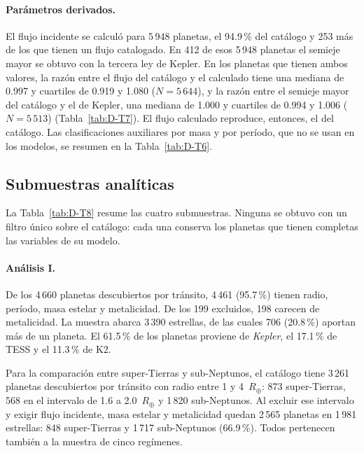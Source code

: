 \paragraph{Parámetros derivados.}
El flujo incidente se calculó para 5\,948 planetas, el 94.9\,\% del catálogo y 253 más
de los que tienen un flujo catalogado. En 412 de esos 5\,948 planetas el semieje mayor se
obtuvo con la tercera ley de Kepler. En los planetas que tienen ambos valores, la razón entre el flujo del
catálogo y el calculado tiene una mediana de 0.997 y cuartiles de 0.919 y 1.080
($N = 5\,644$), y la razón entre el semieje mayor del catálogo y el de Kepler, una mediana
de 1.000 y cuartiles de 0.994 y 1.006 ($N = 5\,513$) (Tabla~\ref{tab:D-T7}). El flujo
calculado reproduce, entonces, el del catálogo. Las clasificaciones auxiliares por masa y
por período, que no se usan en los modelos, se resumen en la Tabla~\ref{tab:D-T6}.

\subsection{Submuestras analíticas}
\label{sec:res-submuestras}

La Tabla~\ref{tab:D-T8} resume las cuatro submuestras. Ninguna se obtuvo con un filtro
único sobre el catálogo: cada una conserva los planetas que tienen completas las variables
de su modelo.



\paragraph{Análisis I.}
De los 4\,660 planetas descubiertos por tránsito, 4\,461 (95.7\,\%) tienen radio, período,
masa estelar y metalicidad. De los 199 excluidos, 198 carecen de metalicidad. La muestra
abarca 3\,390 estrellas, de las cuales 706 (20.8\,\%) aportan más de un planeta. El
61.5\,\% de los planetas proviene de \textit{Kepler}, el 17.1\,\% de TESS y el 11.3\,\% de
K2.

Para la comparación entre super-Tierras y sub-Neptunos, el catálogo tiene 3\,261 planetas
descubiertos por tránsito con radio entre 1 y 4~$R_\oplus$: 873 super-Tierras, 568 en el
intervalo de 1.6 a 2.0~$R_\oplus$ y 1\,820 sub-Neptunos. Al excluir ese intervalo y exigir
flujo incidente, masa estelar y metalicidad quedan 2\,565 planetas en 1\,981 estrellas: 848
super-Tierras y 1\,717 sub-Neptunos (66.9\,\%). Todos pertenecen también a la muestra de
cinco regímenes.

